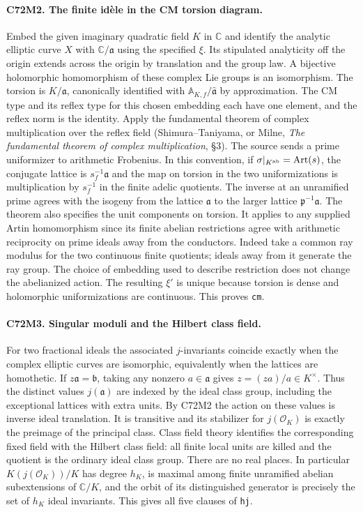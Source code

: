 \paragraph{C72M2. The finite idèle in the CM torsion diagram.}
Embed the given imaginary quadratic field $K$ in $\mathbb C$ and
identify the analytic elliptic curve $X$ with
$\mathbb C/\mathfrak a$ using the specified $\xi$. Its stipulated
analyticity off the origin extends across the origin by translation
and the group law. A bijective holomorphic homomorphism of these
complex Lie groups is an isomorphism. The torsion is
$K/\mathfrak a$, canonically identified with
$\mathbb A_{K,f}/\widehat{\mathfrak a}$ by approximation.
The CM type and its reflex type for this chosen embedding each have
one element, and the reflex norm is the identity.
Apply the fundamental theorem of complex multiplication over the
reflex field (Shimura--Taniyama, or Milne,
\emph{The fundamental theorem of complex multiplication}, \S3).
The source sends a prime uniformizer to arithmetic Frobenius.
In this convention, if $\sigma|_{K^{\rm ab}}=\operatorname{Art}(s)$,
the conjugate lattice is $s_f^{-1}\mathfrak a$ and the map on
torsion in the two uniformizations is multiplication by $s_f^{-1}$
in the finite adelic quotients. The inverse at an unramified prime
agrees with the isogeny from the lattice $\mathfrak a$ to the
larger lattice $\mathfrak p^{-1}\mathfrak a$. The theorem also
specifies the unit components on torsion. It applies to any supplied
Artin homomorphism since its finite abelian restrictions agree with
arithmetic reciprocity on prime ideals away from the conductors.
Indeed take a common ray modulus for the two continuous finite
quotients; ideals away from it generate the ray group. The choice of embedding used to
describe restriction does not change the abelianized action. The
resulting $\xi'$ is unique because torsion is dense and holomorphic
uniformizations are continuous. This proves \texttt{cm}.

\paragraph{C72M3. Singular moduli and the Hilbert class field.}
For two fractional ideals the associated $j$-invariants coincide
exactly when the complex elliptic curves are isomorphic, equivalently
when the lattices are homothetic. If $z\mathfrak a=\mathfrak b$,
taking any nonzero $a\in\mathfrak a$ gives $z=(za)/a\in K^\times$.
Thus the distinct values $j(\mathfrak a)$ are indexed by the ideal
class group, including the exceptional lattices with extra units.
By C72M2 the action on these values is inverse ideal translation.
It is transitive and its stabilizer for $j(\mathcal O_K)$ is exactly
the preimage of the principal class. Class field theory identifies
the corresponding fixed field with the Hilbert class field:
all finite local units are killed and the quotient is the ordinary
ideal class group. There are no real places. In particular
$K(j(\mathcal O_K))/K$ has degree $h_K$, is maximal among finite
unramified abelian subextensions of $\mathbb C/K$, and the orbit of
its distinguished generator is precisely the set of $h_K$ ideal
invariants. This gives all five clauses of \texttt{hj}.

